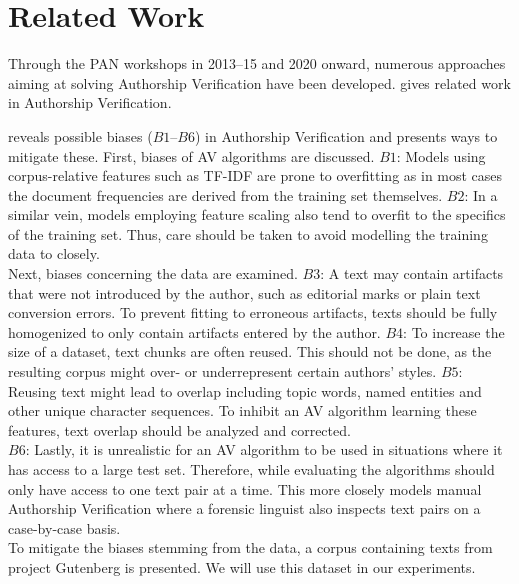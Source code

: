 \chapter{Related Work}\label{related_work}
Through the PAN workshops in 2013--15 and 2020 onward, numerous approaches aiming at solving Authorship Verification have been developed.
\cite{stein2019unbiasedGutenbergCorpus} gives related work in Authorship Verification.

\cite{stein2019unbiasedGutenbergCorpus} reveals possible biases ($B1$--$B6$) in Authorship Verification and presents ways to mitigate these.
First, biases of AV algorithms are discussed.
$B1$: Models using corpus-relative features such as TF-IDF are prone to overfitting as in most cases the document frequencies are derived from the training set themselves.
$B2$: In a similar vein, models employing feature scaling also tend to overfit to the specifics of the training set.
Thus, care should be taken to avoid modelling the training data to closely.\\
Next, biases concerning the data are examined.
$B3$: A text may contain artifacts that were not introduced by the author, such as editorial marks or plain text conversion errors.
To prevent fitting to erroneous artifacts, texts should be fully homogenized to only contain artifacts entered by the author.
$B4$: To increase the size of a dataset, text chunks are often reused.
This should not be done, as the resulting corpus might over- or underrepresent certain authors' styles.
$B5$: Reusing text might lead to overlap including topic words, named entities and other unique character sequences.
To inhibit an AV algorithm learning these features, text overlap should be analyzed and corrected.\\
$B6$: Lastly, it is unrealistic for an AV algorithm to be used in situations where it has access to a large test set.
Therefore, while evaluating the algorithms should only have access to one text pair at a time.
This more closely models manual Authorship Verification where a forensic linguist also inspects text pairs on a case-by-case basis.\\
To mitigate the biases stemming from the data, a corpus containing texts from project Gutenberg is presented.
We will use this dataset in our experiments.


